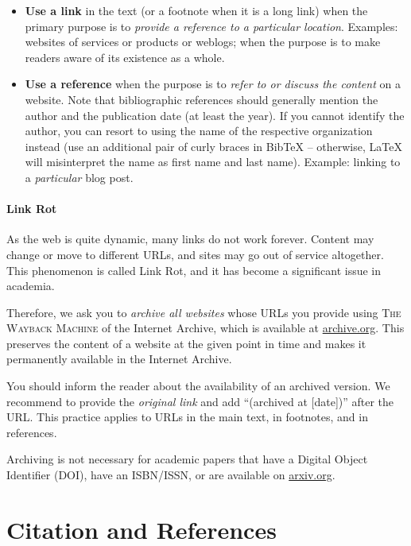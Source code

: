 \begin{itemize}
  \item \textbf{Use a link} in the text (or a footnote when it is a long link) when the primary purpose is to \emph{provide a reference to a particular location}. Examples: websites of services or products or weblogs; when the purpose is to make readers aware of its existence as a whole.
  \item \textbf{Use a reference} when the purpose is to \emph{refer to or discuss the content} on a website. Note that bibliographic references should generally mention the author and the publication date (at least the year). If you cannot identify the author, you can resort to using the name of the respective organization instead (use an additional pair of curly braces in BibTeX -- otherwise, LaTeX will misinterpret the name as first name and last name). Example: linking to a \emph{particular} blog post.
\end{itemize}

\paragraph{Link Rot}

As the web is quite dynamic, many links do not work forever.%
Content may change or move to different URLs, and sites may go out of service altogether. This phenomenon is called Link Rot, and it has become a significant issue in academia.

Therefore, we ask you to \emph{archive all websites} whose URLs you provide using \textsc{The Wayback Machine} of the Internet Archive, which is available at \url{archive.org}.
This preserves the content of a website at the given point in time and makes it permanently available in the Internet Archive.

You should inform the reader about the availability of an archived version.%
We recommend to provide the \emph{original link} and add ``(archived at [date])'' after the URL. This practice applies to URLs in the main text, in footnotes, and in references.

Archiving is not necessary for academic papers that have a Digital Object Identifier (DOI), have an ISBN/ISSN, or are available on \url{arxiv.org}.


\section{Citation and References}

